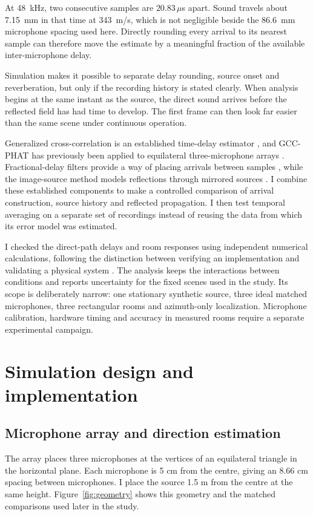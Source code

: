\documentclass{edpsci}
\begin{document}
At 48~kHz, two consecutive samples are $20.83\,\mu$s apart. Sound travels about 7.15~mm in that time at 343~m/s, which is not negligible beside the 86.6~mm microphone spacing used here. Directly rounding every arrival to its nearest sample can therefore move the estimate by a meaningful fraction of the available inter-microphone delay.

Simulation makes it possible to separate delay rounding, source onset and reverberation, but only if the recording history is stated clearly. When analysis begins at the same instant as the source, the direct sound arrives before the reflected field has had time to develop. The first frame can then look far easier than the same scene under continuous operation.

Generalized cross-correlation is an established time-delay estimator \citep{knapp}, and GCC-PHAT has previously been applied to equilateral three-microphone arrays \citep{catur}. Fractional-delay filters provide a way of placing arrivals between samples \citep{laakso}, while the image-source method models reflections through mirrored sources \citep{allen}. I combine these established components to make a controlled comparison of arrival construction, source history and reflected propagation. I then test temporal averaging on a separate set of recordings instead of reusing the data from which its error model was estimated.

I checked the direct-path delays and room responses using independent numerical calculations, following the distinction between verifying an implementation and validating a physical system \citep{ernoult}. The analysis keeps the interactions between conditions and reports uncertainty for the fixed scenes used in the study. Its scope is deliberately narrow: one stationary synthetic source, three ideal matched microphones, three rectangular rooms and azimuth-only localization. Microphone calibration, hardware timing and accuracy in measured rooms require a separate experimental campaign.

\section{Simulation design and implementation}

\subsection{Microphone array and direction estimation}

The array places three microphones at the vertices of an equilateral triangle in the horizontal plane. Each microphone is 5 cm from the centre, giving an 8.66 cm spacing between microphones. I place the source 1.5 m from the centre at the same height. Figure~\ref{fig:geometry} shows this geometry and the matched comparisons used later in the study.
\end{document}
